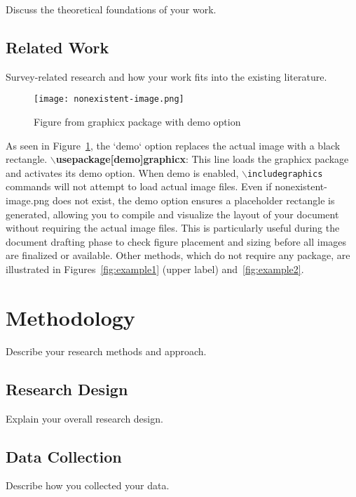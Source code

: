 Discuss the theoretical foundations of your work.

\section{Related Work}

Survey-related research and how your work fits into the existing literature.

\begin{figure}[h!]
    \centering
    \texttt{[image: nonexistent-image.png]}
    \caption{Figure from graphicx package with demo option}
    \label{fig:demo}
\end{figure}

As seen in Figure~\ref{fig:demo}, the `demo` option replaces the actual image with a black rectangle. \textbf{$\backslash$usepackage[demo]{graphicx}}: This line loads the graphicx package and activates its demo option. When demo is enabled, \texttt{$\backslash$includegraphics} commands will not attempt to load actual image files. Even if nonexistent-image.png does not exist, the demo option ensures a placeholder rectangle is generated, allowing you to compile and visualize the layout of your document without requiring the actual image files. This is particularly useful during the document drafting phase to check figure placement and sizing before all images are finalized or available. Other methods, which do not require any package, are illustrated in Figures~\ref {fig:example1} (upper label) and~\ref {fig:example2}.

\chapter{Methodology}

Describe your research methods and approach.

\section{Research Design}

Explain your overall research design.

\section{Data Collection}

Describe how you collected your data.

